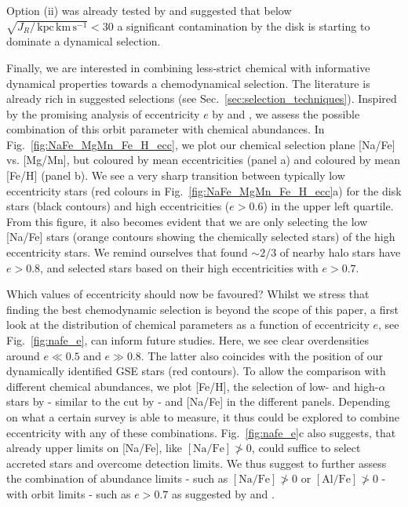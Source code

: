 \documentclass[fleqn,usenatbib]{mnras}
\newcommand{\kpckms}{\,\mathrm{kpc\,km\,s^{-1}}}	%
\begin{document}
Option (ii) was already tested by \citet{Feuillet2020} and suggested that below $\sqrt{J_R / \kpckms} < 30$ a significant contamination by the disk is starting to dominate a dynamical selection.

Finally, we are interested in combining less-strict chemical with informative dynamical properties towards a chemodynamical selection. The literature is already rich in suggested selections (see Sec.~\ref{sec:selection_techniques}). Inspired by the promising analysis of eccentricity $e$ by \citet{Mackereth2019} and \citet{Naidu2020}, we assess the possible combination of this orbit parameter with chemical abundances. In Fig.~\ref{fig:NaFe_MgMn_Fe_H_ecc}, we plot our chemical selection plane [Na/Fe] vs. [Mg/Mn], but coloured by mean eccentricities (panel a) and coloured by mean [Fe/H] (panel b). We see a very sharp transition between typically low eccentricity stars (red colours in Fig.~\ref{fig:NaFe_MgMn_Fe_H_ecc}a) for the disk stars (black contours) and high eccentricities ($e > 0.6$) in the upper left quartile. From this figure, it also becomes evident that we are only selecting the low [Na/Fe] stars (orange contours showing the chemically selected stars) of the high eccentricity stars. We remind ourselves that \citet{Mackereth2019} found $\sim 2/3$ of nearby halo stars have $e > 0.8$, and \citet{Naidu2020} selected stars based on their high eccentricities with $e > 0.7$.

Which values of eccentricity should now be favoured? Whilst we stress that finding the best chemodynamic selection is beyond the scope of this paper, a first look at the distribution of chemical parameters as a function of eccentricity $e$, see Fig.~\ref{fig:nafe_e}, can inform future studies. Here, we see clear overdensities around $e \ll 0.5$ and $e \gg 0.8$. The latter also coincides with the position of our dynamically identified GSE stars (red contours). To allow the comparison with different chemical abundances, we plot [Fe/H], the selection of low- and high-$\alpha$ stars by \citet{Naidu2020} - similar to the cut by \citet{Nissen2010} - and [Na/Fe] in the different panels. Depending on what a certain survey is able to measure, it thus could be explored to combine eccentricity with any of these combinations. Fig.~\ref{fig:nafe_e}c also suggests, that already upper limits on [Na/Fe], like $\mathrm{[Na/Fe]} \not> 0$, could suffice to select accreted stars and overcome detection limits. We thus suggest to further assess the combination of abundance limits - such as $\mathrm{[Na/Fe]} \not> 0$ or $\mathrm{[Al/Fe]} \not> 0$ - with orbit limits - such as $e > 0.7$ as suggested by \citet{Mackereth2019} and \citet{Naidu2020}.
\end{document}
